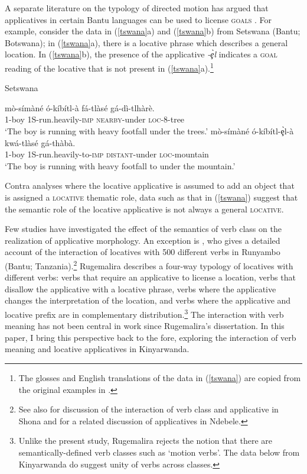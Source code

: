 \documentclass[output=paper]{langsci/langscibook}
\begin{document}
A separate literature on the typology of directed motion has argued that applicatives in certain Bantu languages can be used to license {\scshape goals} \citep{schaefer:1985,sitoe:1996}. For example, consider the data in (\ref{tswana}a) and (\ref{tswana}b) from Setswana (Bantu; Botswana); in (\ref{tswana}a), there is a locative phrase which describes a general location. In (\ref{tswana}b), the presence of the applicative \emph{-\c{è}l} indicates a {\scshape goal}  reading of the locative that is not present in (\ref{tswana}a).\footnote{The glosses and English translations of the data in (\ref{tswana}) are copied from the original examples in \citet{schaefer:1985}.}
\begin{exe}
	\ex\label{tswana}Setswana\begin{xlist}
		\ex  \gll mò-símàné ó-kíbítl-à fá-tlàsé gá-dì-tlhàrè.\\
			1-boy 1S-run.heavily-{\scshape imp} {\scshape nearby-}under {\scshape loc-8-}tree\\
			\glt `The boy is running with heavy footfall under the trees.'
		\ex\gll mò-símàné ó-kíbítl-\c{è}l-à kwá-tlàsé gá-thàbà.\\
			1-boy 1S-run.heavily-to-{\scshape imp} {\scshape distant}-under {\scshape loc-}mountain\\
			\glt `The boy is running with heavy footfall to under the mountain.'  \citep[Tables VI-VII]{schaefer:1985}
	\end{xlist}
\end{exe}
%
Contra analyses where the locative applicative is assumed to add an object that is assigned a {\scshape locative} thematic role, data such as that in (\ref{tswana}) suggest that the semantic role of the locative applicative is not always a general {\scshape locative}.

Few studies have investigated the effect of the semantics of verb class on the realization of applicative morphology. An exception is \citet{rugemalira:1993}, who gives a detailed account of the interaction of locatives with 500 different verbs in Runyambo (Bantu; Tanzania).\footnote{See also \citet{CannMabugu2007} for discussion of the interaction of verb class and applicative in Shona and \citet{sibanda:2016} for a related discussion of applicatives in Ndebele.} Rugemalira describes a four-way typology of locatives with different verbs: verbs that require an applicative to license a location, verbs that disallow the applicative with a locative phrase, verbs where the applicative changes the interpretation of the location, and verbs where the applicative and locative prefix are in complementary distribution.\footnote{Unlike the present study, Rugemalira rejects the notion that there are semantically-defined verb classes such as `motion verbs'. The data below from Kinyarwanda do suggest unity of verbs across classes.}
The interaction with verb meaning has not been central in work since Rugemalira's dissertation. In this paper, I bring this perspective back to the fore, exploring the interaction of verb meaning and locative applicatives in Kinyarwanda.
\end{document}
